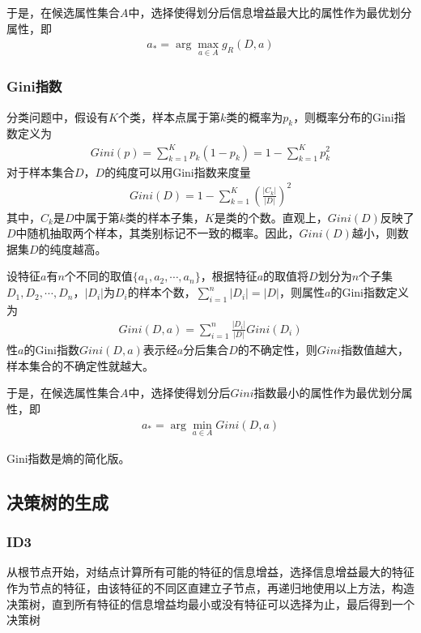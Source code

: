 于是，在候选属性集合$A$中，选择使得划分后信息增益最大比的属性作为最优划分属性，即
\begin{eqnarray}
a_*=\arg\max_{a\in A}g_R(D,a)
\end{eqnarray}

\subsubsection{Gini指数}
分类问题中，假设有$K$个类，样本点属于第$k$类的概率为$p_k$，则概率分布的Gini指数定义为
\begin{eqnarray}
Gini(p)=\sum_{k=1}^K p_k(1-p_k)=1-\sum_{k=1}^K p_k^2
\end{eqnarray}
对于样本集合$D$，$D$的纯度可以用Gini指数来度量
\begin{eqnarray}
Gini(D)=1-\sum_{k=1}^K \left( \frac{|C_k|}{|D|} \right)^2
\end{eqnarray}
其中，$C_k$是$D$中属于第$k$类的样本子集，$K$是类的个数。直观上，$Gini(D)$反映了$D$中随机抽取两个样本，其类别标记不一致的概率。因此，$Gini(D)$越小，则数据集$D$的纯度越高。

设特征$a$有$n$个不同的取值$\{ a_1,a_2,\cdots,a_n \}$，根据特征$a$的取值将$D$划分为$n$个子集$D_1,D_2,\cdots,D_n$，$|D_i|$为$D_i$的样本个数，$\sum_{i=1}^n|D_i|=|D|$，则属性$a$的Gini指数定义为
\begin{eqnarray}
Gini(D,a)=\sum_{i=1}^n \frac{|D_i|}{|D|}Gini(D_i)
\end{eqnarray}
性$a$的Gini指数$Gini(D,a)$表示经$a$分后集合$D$的不确定性，则$Gini$指数值越大，样本集合的不确定性就越大。

于是，在候选属性集合$A$中，选择使得划分后$Gini$指数最小的属性作为最优划分属性，即
\begin{eqnarray}
a_*=\arg\min_{a\in A}Gini(D,a)
\end{eqnarray}

Gini指数是熵的简化版。

\subsection{决策树的生成}
\subsubsection{ID3}
从根节点开始，对结点计算所有可能的特征的信息增益，选择信息增益最大的特征作为节点的特征，由该特征的不同区直建立子节点，再递归地使用以上方法，构造决策树，直到所有特征的信息增益均最小或没有特征可以选择为止，最后得到一个决策树
